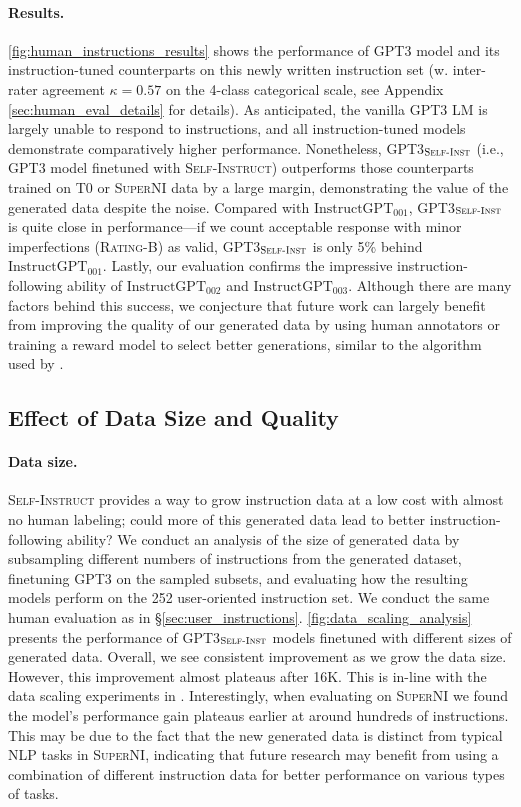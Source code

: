 \documentclass[11pt]{article}
\newcommand{\name}{\textsc{Self-Instruct}}
\newcommand{\supernatShort}{\textsc{SuperNI}}
\newcommand{\tzero}{\textsc{T$0$}}
\newcommand{\gptthree}{\textsc{GPT3}}
\newcommand{\gptself}{\textsc{GPT3}$_{\textsc{Self-Inst}}$}
\newcommand{\gptinstruct}[1]{$\text{InstructGPT}_{\text{#1}}$}
\begin{document}
\paragraph{Results.}
\autoref{fig:human_instructions_results} shows the performance of \gptthree{} model and its instruction-tuned counterparts on this newly written instruction set (w. inter-rater agreement  $\kappa=0.57$ on the 4-class categorical scale, see Appendix \ref{sec:human_eval_details} for details). As anticipated, the vanilla \gptthree{} LM is largely unable to respond to instructions, and all instruction-tuned models demonstrate comparatively higher performance.
Nonetheless, \gptself{} (i.e.,  \gptthree{} model finetuned with \name) outperforms those counterparts trained on \tzero{} or \supernatShort{} data by a large margin, demonstrating the value of the generated data despite the noise. 
Compared with \gptinstruct{001}, \gptself{} is quite close in performance---if we count acceptable response with minor imperfections (\textsc{Rating-B}) as valid, \gptself{} is only 5\% behind \gptinstruct{001}. Lastly, our evaluation confirms the impressive instruction-following ability of \gptinstruct{002} and \gptinstruct{003}. Although there are many factors behind this success, we conjecture that future work can largely benefit from improving the quality of our generated data by using human annotators or training a reward model to select better generations, similar to the algorithm used by \citet{ouyang2022training}.

\subsection{Effect of Data Size and Quality}
\label{subsec:size-and-quality-analysis}

\paragraph{Data size.}
\name{} provides a way to grow instruction data at a low cost with almost no human labeling; could more of this generated data lead to better instruction-following ability? We conduct an analysis of the size of generated data by subsampling different numbers of instructions from the generated dataset, finetuning \gptthree{} on the sampled subsets, and evaluating how the resulting models perform on the 252 user-oriented instruction set. We conduct the same human evaluation as in \S\ref{sec:user_instructions}.
\autoref{fig:data_scaling_analysis} presents the performance of \gptself{} models finetuned with different sizes of generated data. Overall, we see consistent improvement as we grow the data size. However, this improvement almost plateaus after 16K.  
This is in-line with the data scaling experiments in \citet[Fig.~5]{wang2022benchmarking}.
Interestingly, when evaluating on \supernatShort{} we found the model's performance gain plateaus earlier at around hundreds of instructions. 
This may be due to the fact that the new generated data is distinct from typical NLP tasks in \supernatShort{}, indicating that future research may benefit from using a combination of different instruction data for better performance on various types of tasks.
\end{document}

